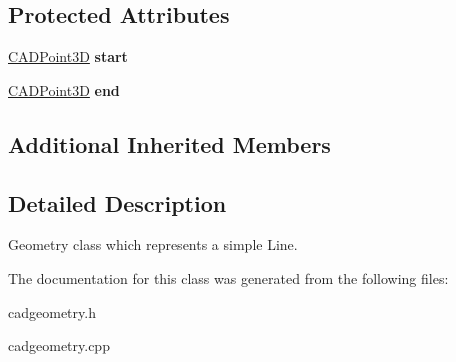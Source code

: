 \subsection*{Protected Attributes}
\begin{DoxyCompactItemize}
\item 
\hyperlink{class_c_a_d_point3_d}{C\+A\+D\+Point3D} {\bfseries start}\hypertarget{class_c_a_d_line_a134324386aac13ead8439ca11c17b42b}{}\label{class_c_a_d_line_a134324386aac13ead8439ca11c17b42b}

\item 
\hyperlink{class_c_a_d_point3_d}{C\+A\+D\+Point3D} {\bfseries end}\hypertarget{class_c_a_d_line_a25a9d4f9a601ab16b83cb5f21d8c0f66}{}\label{class_c_a_d_line_a25a9d4f9a601ab16b83cb5f21d8c0f66}

\end{DoxyCompactItemize}
\subsection*{Additional Inherited Members}


\subsection{Detailed Description}
Geometry class which represents a simple Line. 

The documentation for this class was generated from the following files\+:\begin{DoxyCompactItemize}
\item 
cadgeometry.\+h\item 
cadgeometry.\+cpp\end{DoxyCompactItemize}
